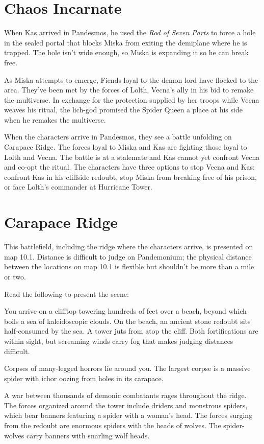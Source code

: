 \documentclass[10pt,a4paper,twoside,bg=print,twocolumn,openany,nodeprecatedcode]{dndbook}
\begin{document}
\section{Chaos Incarnate}
When Kas arrived in Pandesmos, he used the \textit{Rod of Seven Parts} to force a hole in the sealed portal that blocks Miska from exiting the demiplane where he is trapped. The hole isn't wide enough, so Miska is expanding it so he can break free.

As Miska attempts to emerge, Fiends loyal to the demon lord have flocked to the area. They've been met by the forces of Lolth, Vecna's ally in his bid to remake the multiverse. In exchange for the protection supplied by her troops while Vecna weaves his ritual, the lich-god promised the Spider Queen a place at his side when he remakes the multiverse.

When the characters arrive in Pandesmos, they see a battle unfolding on Carapace Ridge. The forces loyal to Miska and Kas are fighting those loyal to Lolth and Vecna. The battle is at a stalemate and Kas cannot yet confront Vecna and co-opt the ritual. The characters have three options to stop Vecna and Kas: confront Kas in his cliffside redoubt, stop Miska from breaking free of his prison, or face Lolth's commander at Hurricane Tower.

\section{Carapace Ridge}
This battlefield, including the ridge where the characters arrive, is presented on map 10.1. Distance is difficult to judge on Pandemonium; the physical distance between the locations on map 10.1 is flexible but shouldn't be more than a mile or two.

Read the following to present the scene:

\begin{DndReadAloud}{}
You arrive on a clifftop towering hundreds of feet over a beach, beyond which boils a sea of kaleidoscopic clouds. On the beach, an ancient stone redoubt sits half-consumed by the sea. A tower juts from atop the cliff. Both fortifications are within sight, but screaming winds carry fog that makes judging distances difficult.

Corpses of many-legged horrors lie around you. The largest corpse is a massive spider with ichor oozing from holes in its carapace.

A war between thousands of demonic combatants rages throughout the ridge. The forces organized around the tower include driders and monstrous spiders, which bear banners featuring a spider with a woman's head. The forces surging from the redoubt are enormous spiders with the heads of wolves. The spider-wolves carry banners with snarling wolf heads.

\end{DndReadAloud}
\end{document}
